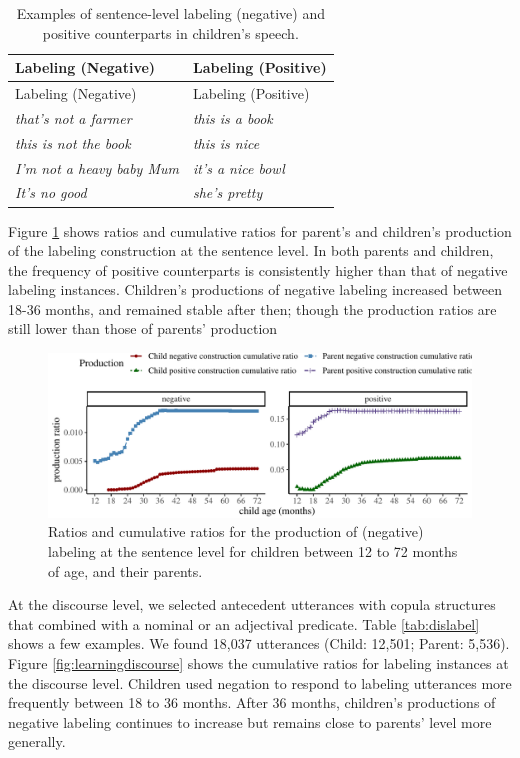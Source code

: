 \documentclass[
  english,
  man,floatsintext]{apa6}
\begin{document}
\begin{longtable}[]{@{}ll@{}}
\caption{\label{tab:label} Examples of sentence-level labeling (negative) and positive counterparts in children's speech.}\tabularnewline
\toprule
Labeling (Negative) & Labeling (Positive) \\
\midrule
\endfirsthead
\toprule
Labeling (Negative) & Labeling (Positive) \\
\midrule
\endhead
\emph{that's not a farmer} & \emph{this is a book} \\
\emph{this is not the book} & \emph{this is nice} \\
\emph{I'm not a heavy baby Mum} & \emph{it's a nice bowl} \\
\emph{It's no good} & \emph{she's pretty} \\
\bottomrule
\end{longtable}

Figure \ref{fig:learning} shows ratios and cumulative ratios for parent's and children's production of the labeling construction at the sentence level. In both parents and children, the frequency of positive counterparts is consistently higher than that of negative labeling instances. Children's productions of negative labeling increased between 18-36 months, and remained stable after then; though the production ratios are still lower than those of parents' production

\begin{figure}[H]

{\centering \includegraphics{neg_construction_article_files/figure-latex/learning-1} 

}

\caption{Ratios and cumulative ratios for the production of (negative) labeling at the sentence level for children between 12 to 72 months of age, and their parents.}\label{fig:learning}
\end{figure}

At the discourse level, we selected antecedent utterances with copula structures that combined with a nominal or an adjectival predicate. Table \ref{tab:dislabel} shows a few examples. We found 18,037 utterances (Child: 12,501; Parent: 5,536). Figure \ref{fig:learningdiscourse} shows the cumulative ratios for labeling instances at the discourse level. Children used negation to respond to labeling utterances more frequently between 18 to 36 months. After 36 months, children's productions of negative labeling continues to increase but remains close to parents' level more generally.
\end{document}
